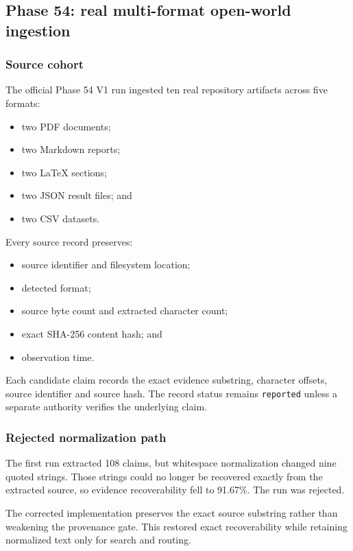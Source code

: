 \subsection{Phase 54: real multi-format open-world ingestion}
\label{subsec:phase54-open-world-ingestion}

\subsubsection{Source cohort}

The official Phase 54 V1 run ingested ten real repository artifacts across
five formats:
\begin{itemize}
    \item two PDF documents;
    \item two Markdown reports;
    \item two \LaTeX{} sections;
    \item two JSON result files; and
    \item two CSV datasets.
\end{itemize}

Every source record preserves:
\begin{itemize}
    \item source identifier and filesystem location;
    \item detected format;
    \item source byte count and extracted character count;
    \item exact SHA-256 content hash; and
    \item observation time.
\end{itemize}

Each candidate claim records the exact evidence substring, character offsets,
source identifier and source hash.  The record status remains
\texttt{reported} unless a separate authority verifies the underlying claim.

\subsubsection{Rejected normalization path}

The first run extracted 108 claims, but whitespace normalization changed nine
quoted strings.  Those strings could no longer be recovered exactly from the
extracted source, so evidence recoverability fell to 91.67\%.  The run was
rejected.

The corrected implementation preserves the exact source substring rather
than weakening the provenance gate.  This restored exact recoverability while
retaining normalized text only for search and routing.


